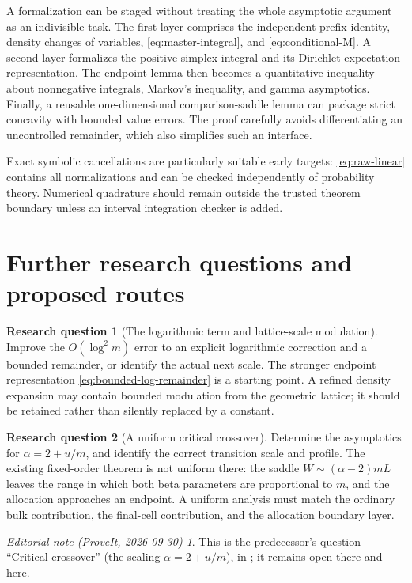 \documentclass[11pt,a4paper]{article}
\numberwithin{equation}{section}
\theoremstyle{definition}\newaliascnt{definition}{theorem}
\newtheorem{problem}[problem]{Research question}
\theoremstyle{remark}\newaliascnt{remark}{theorem}
\newtheorem*{ednote}{Editorial note (ProveIt, 2026-09-30)}
\begin{document}
A formalization can be staged without treating the whole asymptotic argument
as an indivisible task. The first layer comprises the independent-prefix
identity, density changes of variables, \eqref{eq:master-integral}, and
\eqref{eq:conditional-M}. A second layer formalizes the positive simplex
integral and its Dirichlet expectation representation. The endpoint lemma
then becomes a quantitative inequality about nonnegative integrals, Markov's
inequality, and gamma asymptotics. Finally, a reusable one-dimensional
comparison-saddle lemma can package strict concavity with bounded value
errors. The proof carefully avoids differentiating an uncontrolled remainder,
which also simplifies such an interface.

Exact symbolic cancellations are particularly suitable early targets:
\eqref{eq:raw-linear} contains all normalizations and can be checked
independently of probability theory. Numerical quadrature should remain
outside the trusted theorem boundary unless an interval integration checker
is added.

\section{Further research questions and proposed routes}
\label{sec:future}

\begin{problem}[The logarithmic term and lattice-scale modulation]
Improve the $O(\log^2m)$ error to an explicit logarithmic correction and a
bounded remainder, or identify the actual next scale. The stronger endpoint
representation \eqref{eq:bounded-log-remainder} is a starting point.
A refined density expansion may contain bounded modulation from the
geometric lattice; it should be retained rather than silently replaced by
a constant.
\end{problem}

\begin{problem}[A uniform critical crossover]
Determine the asymptotics for $\alpha=2+u/m$, and identify the correct
transition scale and profile. The existing fixed-order theorem is not
uniform there: the saddle $W\sim(\alpha-2)mL$ leaves the range in which
both beta parameters are proportional to $m$, and the allocation approaches
an endpoint. A uniform analysis must match the ordinary bulk contribution,
the final-cell contribution, and the allocation boundary layer.
\end{problem}
\begin{ednote}
This is the predecessor's question ``Critical crossover'' (the scaling
$\alpha=2+u/m$), in
;
it remains open there and here.
\end{ednote}
\end{document}
